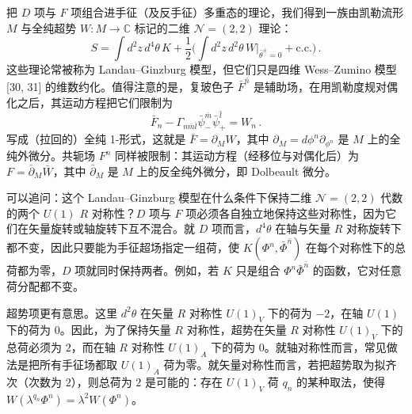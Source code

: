 把 $D$ 项与 $F$ 项组合进手征（及反手征）多重态的理论，我们得到一族由凯勒流形 $M$ 与全纯超势 $W:M\to\mathbb{C}$ 标记的二维 $\mathcal{N}=(2,2)$ 理论：
\begin{equation}
S=\int d^2z\,d^4\theta\,K+\frac12\Big(\int d^2z\,d^2\theta\,W\big|_{\bar\theta^\pm=0}+\text{c.c.}\Big)\,.
\tag{2.28}
\end{equation}
这些理论常被称为 Landau--Ginzburg 模型，但它们只是四维 Wess--Zumino 模型 [30, 31] 的维数约化。值得注意的是，复玻色子 $\bar F^{\bar n}$ 是辅助场，在用凯勒度规对偶化之后，其运动方程把它们限制为
\begin{equation}
\bar F_n-\Gamma_{n\bar m\bar l}\bar\psi^{\bar m}_-\bar\psi^{\bar l}_+=W_n\,.
\tag{2.29}
\end{equation}
写成（拉回的）全纯 1-形式，这就是 $\bar F=\partial_MW$，其中 $\partial_M=d\phi^n\partial_{\phi^n}$ 是 $M$ 上的全纯外微分。共轭场 $F^n$ 同样被限制：其运动方程（经移位与对偶化后）为 $F=\bar\partial_M\bar W$，其中 $\bar\partial_M$ 是 $M$ 上的反全纯外微分，即 Dolbeault 微分。

可以追问：这个 Landau--Ginzburg 模型在什么条件下保持二维 $\mathcal{N}=(2,2)$ 代数的两个 $U(1)$ $R$ 对称性？$D$ 项与 $F$ 项必须各自独立地保持这些对称性，因为它们在矢量旋转或轴旋转下互不混合。就 $D$ 项而言，$d^4\theta$ 在轴与矢量 $R$ 对称旋转下都不变，因此只要能为手征超场指定一组荷，使 $K(\Phi^n,\bar\Phi^{\bar n})$ 在每个对称性下的总荷都为零，$D$ 项就同时保持两者。例如，若 $K$ 只是组合 $\Phi^n\bar\Phi^{\bar n}$ 的函数，它对任意荷分配都不变。

超势项更有意思。这里 $d^2\theta$ 在矢量 $R$ 对称性 $U(1)_V$ 下的荷为 $-2$，在轴 $U(1)$ 下的荷为 $0$。因此，为了保持矢量 $R$ 对称性，超势在矢量 $R$ 对称性 $U(1)_V$ 下的总荷必须为 $2$，而在轴 $R$ 对称性 $U(1)_A$ 下的荷为 $0$。就轴对称性而言，常见做法是把所有手征场都取 $U(1)_A$ 荷为零。就矢量对称性而言，若把超势取为拟齐次（次数为 $2$），则总荷为 $2$ 是可能的：存在 $U(1)_V$ 荷 $q_n$ 的某种取法，使得 $W(\lambda^{q_n}\Phi^n)=\lambda^2W(\Phi^n)$。

